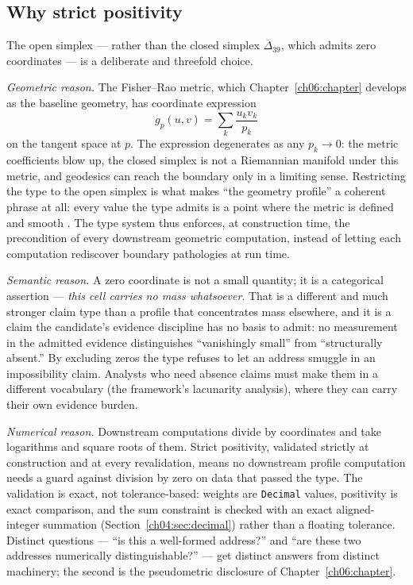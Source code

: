 \subsection{Why strict positivity}\label{ch04:sec:positivity}

The open simplex --- rather than the closed simplex
$\overline{\Delta}_{39}$, which admits zero coordinates --- is a deliberate
and threefold choice.

\emph{Geometric reason.} The Fisher--Rao metric, which
Chapter~\ref{ch06:chapter} develops as the baseline geometry, has
coordinate expression
\[
g_p(u, v) = \sum_{k} \frac{u_k v_k}{p_k}
\]
on the tangent space at $p$. The expression degenerates as any
$p_k \to 0$: the metric coefficients blow up, the closed simplex is not a
Riemannian manifold under this metric, and geodesics can reach the boundary
only in a limiting sense. Restricting the type to the open simplex is what
makes ``the geometry profile'' a coherent phrase at all: every value the
type admits is a point where the metric is defined and smooth
\cite{amari,ay}. The type system thus enforces, at construction time, the
precondition of every downstream geometric computation, instead of letting
each computation rediscover boundary pathologies at run time.

\emph{Semantic reason.} A zero coordinate is not a small quantity; it is a
categorical assertion --- \emph{this cell carries no mass whatsoever}. That
is a different and much stronger claim type than a profile that
concentrates mass elsewhere, and it is a claim the candidate's evidence
discipline has no basis to admit: no measurement in the admitted evidence
distinguishes ``vanishingly small'' from ``structurally absent.'' By
excluding zeros the type refuses to let an address smuggle in an
impossibility claim. Analysts who need absence claims must make them in a
different vocabulary (the framework's lacunarity analysis), where they can
carry their own evidence burden.

\emph{Numerical reason.} Downstream computations divide by coordinates and
take logarithms and square roots of them. Strict positivity, validated
strictly at construction and at every revalidation, means no downstream
profile computation needs a guard against division by zero on data that
passed the type. The validation is exact, not tolerance-based: weights are
\texttt{Decimal} values, positivity is exact comparison, and the sum
constraint is checked with an exact aligned-integer summation
(Section~\ref{ch04:sec:decimal}) rather than a floating tolerance. Distinct
questions --- ``is this a well-formed address?'' and ``are these two
addresses numerically distinguishable?'' --- get distinct answers from
distinct machinery; the second is the pseudometric disclosure of
Chapter~\ref{ch06:chapter}.

